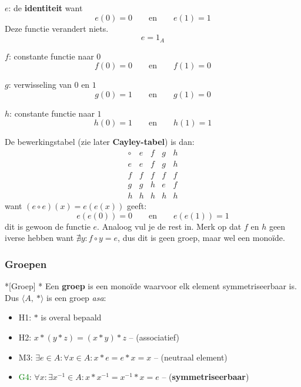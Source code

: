$e$: de \textbf{identiteit} want
\begin{equation*}
    e(0) = 0 \qquad \text{en} \qquad e(1) = 1
\end{equation*}
Deze functie verandert niets.
\begin{equation*}
    e = 1_A
\end{equation*}

$f$: constante functie naar $0$
\begin{equation*}
    f(0) = 0 \qquad \text{en} \qquad f(1) = 0
\end{equation*}

$g$: verwisseling van $0$ en $1$
\begin{equation*}
    g(0) = 1 \qquad \text{en} \qquad g(1) = 0
\end{equation*}

$h$: constante functie naar $1$
\begin{equation*}
    h(0) = 1 \qquad \text{en} \qquad h(1) = 1
\end{equation*}

De bewerkingstabel (zie later \textbf{Cayley-tabel}) is dan:
\begin{equation*}
    \begin{array}{c|cccc}
        \circ & e & f & g & h \\
        \hline
        e     & e & f & g & h  \\
        f     & f & f & f & f \\
        g     & g & h & e & f \\
        h     & h & h & h & h 
    \end{array}
\end{equation*}
want $(e \circ e)(x) = e(e(x))$ geeft:
\begin{equation*}
    e(e(0)) = 0 \qquad \text{en} \qquad e(e(1)) = 1 
\end{equation*}
dit is gewoon de functie $e$. Analoog vul je de rest in. Merk op dat $f$ en $h$ geen iverse hebben want $\nexists y : f \circ y = e$, dus dit is geen groep, maar wel een monoïde.

\subsubsection{Groepen}

\begin{nicedefinition}*[Groep]
    \nextpart[]*
    Een \textcolor{PineGreen!75!black}{\textbf{groep}} is een monoïde waarvoor elk element symmetriseerbaar is. Dus $\langle A,\ * \rangle$ is een groep \emph{asa}:
    \begin{itemize}
        \item H1: $*$ is overal bepaald
        \item H2: $x*(y*z) = (x*y)*z$ -- (associatief)
        \item M3: $\exists e \in A : \forall x \in A : x * e = e * x = x$ -- (neutraal element)
        \item \textcolor{Green}{G4}: $\forall x : \exists x^{-1} \in A : x * x^{-1} = x^{-1} * x = e$ -- (\textbf{symmetriseerbaar})
    \end{itemize}
\end{nicedefinition}

